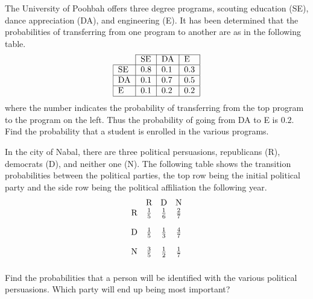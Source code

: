 \begin{ex} The University of Poohbah offers three degree programs, scouting
education (SE), dance appreciation (DA), and engineering (E). It has been
determined that the probabilities of transferring from one program to
another are as in the following table.
\begin{equation*}
\begin{tabular}{l|l|l|l|}
\cline{2-4}
& SE & DA & E \\ \hline
\multicolumn{1}{|l|}{SE} & 0.8 & 0.1 & 0.3 \\ \hline
\multicolumn{1}{|l|}{DA} & 0.1 & 0.7 & 0.5 \\ \hline
\multicolumn{1}{|l|}{E} & 0.1 & 0.2 & 0.2 \\ \hline
\end{tabular}
\end{equation*}
where the number indicates the probability of transferring from the top
program to the program on the left. Thus the probability of going from DA to
E is $0.2$. Find the probability that a student is enrolled in the various
programs.
\end{ex}

\begin{ex} In the city of Nabal, there are three political persuasions,
republicans (R), democrats (D), and neither one (N). The following table
shows the transition probabilities between the political parties, the top
row being the initial political party and the side row being the political
affiliation the following year.%
\begin{equation*}
\begin{array}{cccc}
& \text{R} & \text{D} & \text{N} \\
\text{R} & \vspace{0.05in}\frac{1}{5} & \vspace{0.05in}\frac{1}{6} & \vspace{0.05in}\frac{2}{7} \\
\text{D} & \vspace{0.05in}\frac{1}{5} & \vspace{0.05in}\frac{1}{3} & \vspace{0.05in}\frac{4}{7} \\
\text{N} & \vspace{0.05in}\frac{3}{5} & \vspace{0.05in}\frac{1}{2} & \vspace{0.05in}\frac{1}{7}
\end{array}
\end{equation*}
Find the probabilities that a person will be identified with the various
political persuasions. Which party will end up being most important?
\end{ex}

